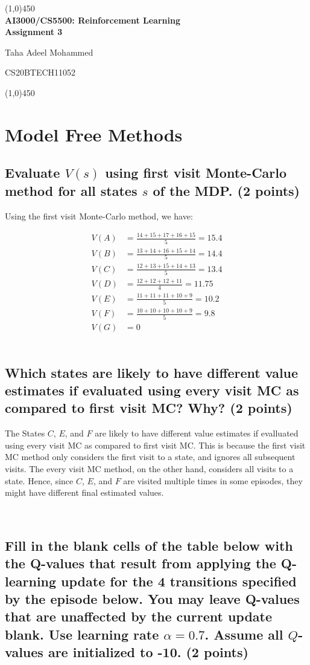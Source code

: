 \documentclass{article}
\renewcommand{\author}{Taha Adeel Mohammed}
\newcommand{\rollnumber}{CS20BTECH11052}
\newcommand{\course}{AI3000/CS5500: Reinforcement Learning}
\newcommand{\assignment}{Assignment 3}
\renewcommand{\maketitle}{
	\begin{center}
		\line(1,0){450} \\
		\vspace*{1ex}
        \Large{\textbf{\course}} \\
        \Large{\textbf{\assignment}} \\
    \end{center}
	\large{\author}
	\begin{flushright}
		\vspace*{-5ex}
		\rollnumber \\
	\end{flushright}
	\begin{center}
		\vspace*{-1ex}
		\line(1,0){450}
	\end{center}
}
\begin{document}
\maketitle


\section{Model Free Methods}
\subsection{Evaluate $V(s)$ using first visit Monte-Carlo method for all states $s$ of the MDP\@. (2 points)}

Using the first visit Monte-Carlo method, we have:

\begin{align*}
	V(A) &= \frac{14 + 15 + 17 + 16 + 15}{5} = 15.4 \\
	V(B) &= \frac{13 + 14 + 16 + 15 + 14}{5} = 14.4 \\
	V(C) &= \frac{12 + 13 + 15 + 14 + 13}{5} = 13.4 \\
	V(D) &= \frac{12 + 12 + 12 + 11}{4} = 11.75 \\
	V(E) &= \frac{11 + 11 + 11 + 10 + 9}{5} = 10.2 \\
	V(F) &= \frac{10 + 10 + 10 + 10 + 9}{5} = 9.8 \\
	V(G) &= 0
\end{align*}
\,\\

\subsection{Which states are likely to have different value estimates if evaluated using every visit MC as compared to first visit MC\@? Why\@? (2 points)}

The States $C$, $E$, and $F$ are likely to have different value estimates if evalluated using every visit MC as compared to first visit MC\@. This is because the first visit MC method only considers the first visit to a state, and ignores all subsequent visits. The every visit MC method, on the other hand, considers all visits to a state. Hence, since $C$, $E$, and $F$ are visited multiple times in some episodes, they might have different final estimated values.

\,\\

\subsection{Fill in the blank cells of the table below with the Q-values that result from applying the Q-learning update for the 4 transitions specified by the episode below. You may leave Q-values that are unaffected by the current update blank. Use learning rate $\alpha = 0.7$.
Assume all $Q$-values are initialized to -10. (2 points)}
\end{document}
